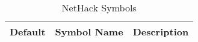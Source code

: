 {
\small
\begin{longtable}{lll}
\caption[]{NetHack Symbols}\\
Default  & Symbol Name                & Description\\
\hline \hline
\endhead

\end{longtable}}
